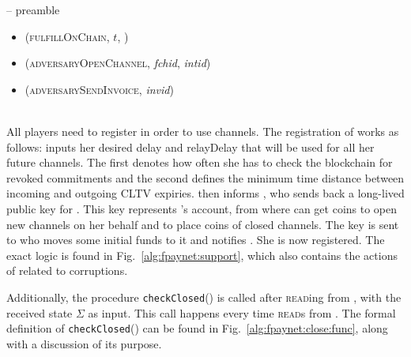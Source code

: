 \begin{center}
\begin{systembox}{\fpaynet{} -- preamble}
\begin{itemize}
\begin{itemize}
          \item (\textsc{fulfillOnChain}, $t$, \alice)
          \item (\textsc{adversaryOpenChannel}, \textit{fchid},
          \textit{intid})
          \item (\textsc{adversarySendInvoice}, \textit{invid})
        \end{itemize}
      \end{itemize}
    \end{systembox}
    \label{alg:fpaynet:interface}
  \end{center} \ \\

  All players need to register in order to use channels. The registration of
  \alice{} works as follows: \alice{} inputs her desired delay and relayDelay
  that will be used for all her future channels. The first denotes how often she
  has to check the blockchain for revoked commitments and the second defines the
  minimum time distance between incoming and outgoing CLTV expiries. \fpaynet{}
  then informs \simulator{}, who sends back a long-lived public key for \alice.
  This key represents \alice's account, from where \fpaynet{} can get coins to
  open new channels on her behalf and to place coins of closed channels. The key
  is sent to \alice{} who moves some initial funds to it and notifies
  \fpaynet{}. She is now registered. The exact logic is found in
  Fig.~\ref{alg:fpaynet:support}, which also contains the actions of \fpaynet{}
  related to corruptions.

  Additionally, the procedure \texttt{checkClosed}() is called after
  \textsc{read}ing from \ledger, with the received state $\Sigma$ as input. This
  call happens every time \fpaynet{} \textsc{read}s from \ledger. The formal
  definition of \texttt{checkClosed}() can be found in
  Fig.~\ref{alg:fpaynet:close:func}, along with a discussion of its purpose.

